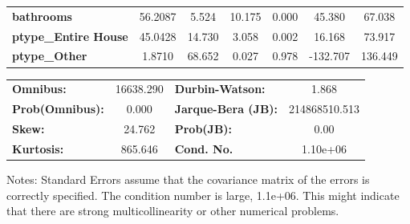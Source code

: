 \begin{center}
\begin{tabular}{lcccccc}
\textbf{bathrooms}              &      56.2087  &        5.524     &    10.175  &         0.000        &       45.380    &       67.038     \\
\textbf{ptype\_Entire House}    &      45.0428  &       14.730     &     3.058  &         0.002        &       16.168    &       73.917     \\
\textbf{ptype\_Other}           &       1.8710  &       68.652     &     0.027  &         0.978        &     -132.707    &      136.449     \\
\bottomrule
\end{tabular}
\begin{tabular}{lclc}
\textbf{Omnibus:}       & 16638.290 & \textbf{  Durbin-Watson:     } &       1.868    \\
\textbf{Prob(Omnibus):} &    0.000  & \textbf{  Jarque-Bera (JB):  } & 214868510.513  \\
\textbf{Skew:}          &   24.762  & \textbf{  Prob(JB):          } &        0.00    \\
\textbf{Kurtosis:}      &  865.646  & \textbf{  Cond. No.          } &    1.10e+06    \\
\bottomrule
\end{tabular}
\end{center}

Notes: \newline
 [1] Standard Errors assume that the covariance matrix of the errors is correctly specified. \newline
 [2] The condition number is large, 1.1e+06. This might indicate that there are \newline
 strong multicollinearity or other numerical problems.